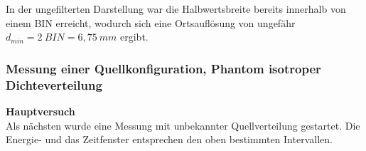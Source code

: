              In der ungefilterten Darstellung war die Halbwertsbreite bereits innerhalb von einem BIN erreicht, wodurch sich eine Ortsauflösung von ungefähr $d_{min} = 2\ \unit{BIN} = 6,75\ \unit{mm}$ ergibt.
            
        \subsubsection{Messung einer Quellkonfiguration, Phantom isotroper Dichteverteilung}
          \textbf{Hauptversuch}\\
          Als nächsten wurde eine Messung mit unbekannter Quellverteilung gestartet. Die Energie- und das Zeitfenster entsprechen den oben bestimmten Intervallen.\\ \ \\

